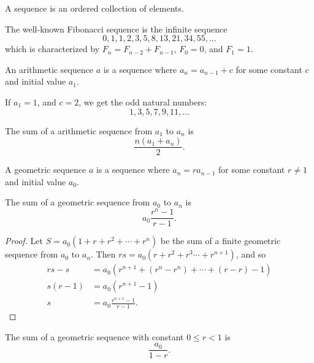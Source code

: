 \begin{defn}
    A sequence is an ordered collection of elements.
\end{defn}

\begin{exmp}
    The well-known Fibonacci sequence is the infinite sequence \[0, 1, 1, 2, 3, 5, 8, 13, 21, 34, 55, \ldots\]
    which is characterized by $F_{n} = F_{n-2} + F_{n-1}$, $F_0 = 0$, and $F_1 = 1$.
\end{exmp}

\begin{defn}
    An arithmetic sequence $a$ is a sequence where $a_n = a_{n-1} + c$ for some constant $c$ and initial value $a_1$.
\end{defn}

\begin{exmp}
    If $a_1 = 1$, and $c = 2$, we get the odd natural numbers: \[1, 3, 5, 7, 9, 11, \ldots\]
\end{exmp}

\begin{prop}\label{finite-arithmetic-sum}
    The sum of a arithmetic sequence from $a_1$ to $a_n$ is \[\frac{n(a_1 + a_n)}{2}.\]
\end{prop}

\begin{defn}
    A geometric sequence $a$ is a sequence where $a_n = ra_{n-1}$ for some constant $r \neq 1$ and initial value $a_0$.
\end{defn}

\begin{prop}\label{finite-geometric-sum}
    The sum of a geometric sequence from $a_0$ to $a_n$ is \[a_0\frac{r^n - 1}{r - 1}.\]
\end{prop}

\begin{proof}
    Let $S = a_0(1 + r + r^2 + \cdots + r^n)$ be the sum of a finite geometric sequence from $a_0$ to $a_n$. Then $rs = a_0(r + r^2 + r^3 \cdots + r^{n+1})$, and so
    \begin{align*}
        rs - s &= a_0(r^{n+1} + (r^n - r^n) + \cdots + (r - r) - 1)\\
        s(r - 1) &= a_0(r^{n+1} - 1) \\
    s &= a_0\frac{r^{n+1} - 1}{r - 1}.
    \end{align*}
\end{proof}

\begin{prop}\label{infinite-geometric-sum}
    The sum of a geometric sequence with constant $0 \leq r < 1$ is \[\frac{a_0}{1-r}.\]
\end{prop}

